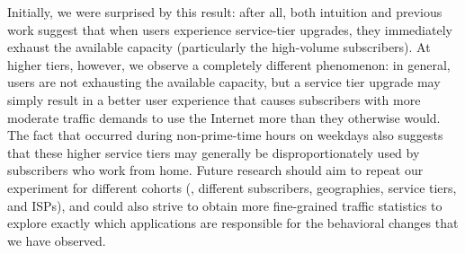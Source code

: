 Initially, we were surprised by this result: after all, both intuition
and previous work suggest that when users experience service-tier
upgrades, they immediately exhaust the available capacity (particularly
the high-volume subscribers). At higher tiers, however, we observe a
completely different phenomenon: in general, users are not exhausting
the available capacity, but a service tier upgrade may simply result in
a better user experience that causes subscribers with more moderate
traffic demands to use the Internet more than they otherwise would.  The
fact that  occurred during non-prime-time hours on
weekdays also suggests that these higher service tiers may generally be
disproportionately used by subscribers who work from home.  Future
research should aim to repeat our experiment for different cohorts (\ie,
different subscribers, geographies, service tiers, and ISPs), and could
also strive to obtain more fine-grained traffic statistics to explore
exactly which applications are responsible for the behavioral changes
that we have observed.
%
%
%
%
